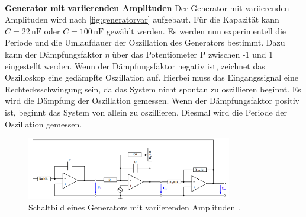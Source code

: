 \\
\textbf{Generator mit variierenden Amplituden}
Der Generator mit variierenden Amplituden wird nach \autoref{fig:generatorvar} aufgebaut. Für die Kapazität kann $C=22\,\text{nF}$ oder 
$C=100\,\text{nF}$ gewählt werden. Es werden nun experimentell die Periode und die Umlaufdauer 
der Oszillation des Generators bestimmt. Dazu kann der Dämpfungsfaktor $\eta$ über das Potentiometer P zwischen -1 und 1 
eingestellt werden. Wenn der Dämpfungsfaktor negativ ist, zeichnet das Oszilloskop eine gedämpfte Oszillation auf. Hierbei muss das Eingangssignal 
eine Rechtecksschwingung sein, da das System nicht spontan zu oszillieren beginnt. Es wird die Dämpfung der Oszillation gemessen.
Wenn der Dämpfungsfaktor positiv ist, beginnt das System von allein zu oszillieren. Diesmal wird die Periode der Oszillation gemessen.  
\begin{figure}
    \centering
    \includegraphics[width=0.8\textwidth]{generatorvar.png}
    \caption{Schaltbild eines Generators mit variierenden Amplituden \cite{ap51}.}
    \label{fig:generatorvar}
\end{figure}
\\